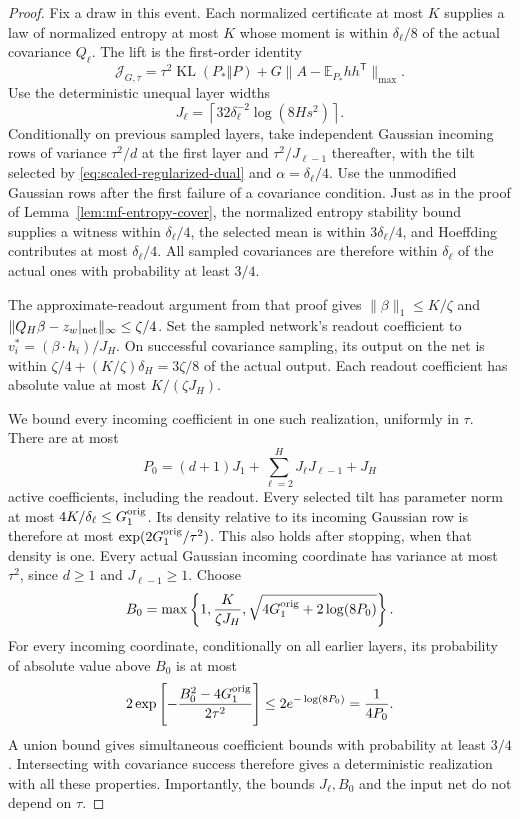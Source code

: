 \begin{proof}
Fix a draw in this event.  Each normalized certificate at most $K$
supplies a law of normalized entropy at most $K$ whose moment is
within $\delta_\ell/8$ of the actual covariance $Q_\ell$.
The lift is the first-order identity
\[
 \mathcal J_{G,\tau}
 =\tau^2\operatorname{KL}(P_*\Vert P)
       +G\|A-\mathbb E_{P_*}hh^{\mathsf T}\|_{\max}.
\]
Use the deterministic unequal layer widths
\[
 J_\ell=\left\lceil32\delta_\ell^{-2}\log(8Hs^2)\right\rceil.
\]
Conditionally on previous sampled layers, take independent Gaussian
incoming rows of variance $\tau^2/d$ at the first layer and
$\tau^2/J_{\ell-1}$ thereafter, with the tilt selected by
\eqref{eq:scaled-regularized-dual} and $\alpha=\delta_\ell/4$.
Use the unmodified Gaussian rows after the first failure of a
covariance condition.  Just as in the proof of
Lemma~\ref{lem:mf-entropy-cover}, the normalized entropy stability
bound supplies a witness within $\delta_\ell/4$, the selected mean
is within $3\delta_\ell/4$, and Hoeffding contributes at most
$\delta_\ell/4$.  All sampled covariances are therefore within
$\delta_\ell$ of the actual ones with probability at least $3/4$.

The approximate-readout argument from that proof gives
$\|\beta\|_1\leq K/\zeta$ and
$\|Q_H\beta-z_w|_{\rm net}\|_\infty\leq\zeta/4$.
Set the sampled network's readout coefficient to
$v_i^*=(\beta\cdot h_i)/J_H$.  On successful covariance sampling,
its output on the net is within
$\zeta/4+(K/\zeta)\delta_H=3\zeta/8$ of the actual output.
Each readout coefficient has absolute value at most $K/(\zeta J_H)$.

We bound every incoming coefficient in one such realization,
uniformly in $\tau$.  There are at most
\[
 P_0=(d+1)J_1+\sum_{\ell=2}^H J_\ell J_{\ell-1}+J_H
\]
active coefficients, including the readout.  Every selected tilt
has parameter norm at most $4K/\delta_\ell\leq G_1^{\rm orig}$.
Its density relative to its incoming Gaussian row is therefore at
most $\exp(2G_1^{\rm orig}/\tau^2)$.  This also holds after stopping,
when that density is one.  Every actual Gaussian incoming coordinate
has variance at most $\tau^2$, since $d\geq1$ and
$J_{\ell-1}\geq1$.
Choose
\[
 B_0=\max\left\{1,\frac K{\zeta J_H},
       \sqrt{4G_1^{\rm orig}+2\log(8P_0)}\right\}.
\]
For every incoming coordinate, conditionally on all earlier layers,
its probability of absolute value above $B_0$ is at most
\[
 2\exp\left[-\frac{B_0^2-4G_1^{\rm orig}}{2\tau^2}\right]
       \leq2e^{-\log(8P_0)}=\frac1{4P_0}.
\]
A union bound gives simultaneous coefficient bounds with probability
at least $3/4$.  Intersecting with covariance success therefore gives
a deterministic realization with all these properties.  Importantly,
the bounds $J_\ell,B_0$ and the input net do not depend on $\tau$.


\end{proof}
